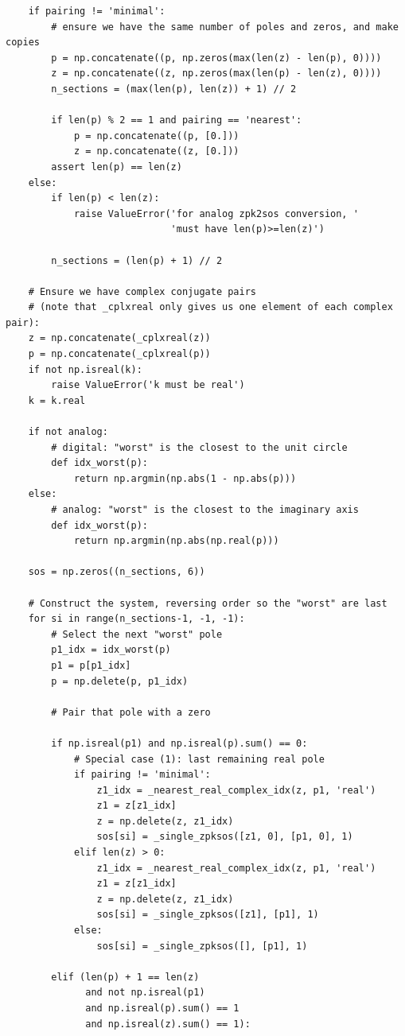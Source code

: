 \documentclass[12pt,a4paper]{article}
\begin{document}
\begin{itemize}
\begin{verbatim}
    if pairing != 'minimal':
        # ensure we have the same number of poles and zeros, and make copies
        p = np.concatenate((p, np.zeros(max(len(z) - len(p), 0))))
        z = np.concatenate((z, np.zeros(max(len(p) - len(z), 0))))
        n_sections = (max(len(p), len(z)) + 1) // 2

        if len(p) % 2 == 1 and pairing == 'nearest':
            p = np.concatenate((p, [0.]))
            z = np.concatenate((z, [0.]))
        assert len(p) == len(z)
    else:
        if len(p) < len(z):
            raise ValueError('for analog zpk2sos conversion, '
                             'must have len(p)>=len(z)')

        n_sections = (len(p) + 1) // 2

    # Ensure we have complex conjugate pairs
    # (note that _cplxreal only gives us one element of each complex pair):
    z = np.concatenate(_cplxreal(z))
    p = np.concatenate(_cplxreal(p))
    if not np.isreal(k):
        raise ValueError('k must be real')
    k = k.real

    if not analog:
        # digital: "worst" is the closest to the unit circle
        def idx_worst(p):
            return np.argmin(np.abs(1 - np.abs(p)))
    else:
        # analog: "worst" is the closest to the imaginary axis
        def idx_worst(p):
            return np.argmin(np.abs(np.real(p)))

    sos = np.zeros((n_sections, 6))

    # Construct the system, reversing order so the "worst" are last
    for si in range(n_sections-1, -1, -1):
        # Select the next "worst" pole
        p1_idx = idx_worst(p)
        p1 = p[p1_idx]
        p = np.delete(p, p1_idx)

        # Pair that pole with a zero

        if np.isreal(p1) and np.isreal(p).sum() == 0:
            # Special case (1): last remaining real pole
            if pairing != 'minimal':
                z1_idx = _nearest_real_complex_idx(z, p1, 'real')
                z1 = z[z1_idx]
                z = np.delete(z, z1_idx)
                sos[si] = _single_zpksos([z1, 0], [p1, 0], 1)
            elif len(z) > 0:
                z1_idx = _nearest_real_complex_idx(z, p1, 'real')
                z1 = z[z1_idx]
                z = np.delete(z, z1_idx)
                sos[si] = _single_zpksos([z1], [p1], 1)
            else:
                sos[si] = _single_zpksos([], [p1], 1)

        elif (len(p) + 1 == len(z)
              and not np.isreal(p1)
              and np.isreal(p).sum() == 1
              and np.isreal(z).sum() == 1):


\end{verbatim}
\end{itemize}
\end{document}
